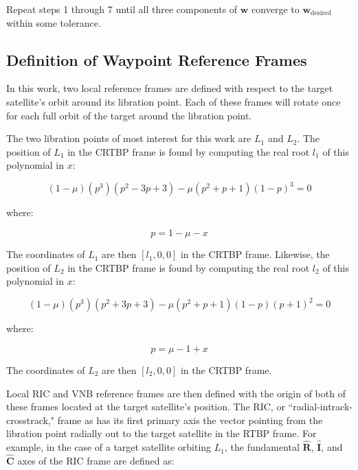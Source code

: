\documentclass[a4paper]{article}
\begin{document}
Repeat steps 1 through 7 until all three components of \(\mathbf{w}\) converge to \(\mathbf{w}_{\mathrm{desired}}\) within some tolerance.


\subsection{Definition of Waypoint Reference Frames}

In this work, two local reference frames are defined with respect to the target satellite's orbit around its libration point.  Each of these frames will rotate once for each full orbit of the target around the libration point.

The two libration points of most interest for this work are \(L_1\) and \(L_2\).  The position of \(L_1\) in the CRTBP frame is found by computing the real root \(l_1\) of this polynomial in \(x\):

\begin{equation} \label{eq:L1}
(1 - \mu)(p^3)(p^2 - 3p + 3) - \mu(p^2 + p + 1)(1 - p)^3 = 0
\end{equation}

where:

\begin{equation*}
p = 1 - \mu - x
\end{equation*}

The coordinates of \(L_1\) are then \([l_1, 0, 0]\) in the CRTBP frame.  Likewise, the position of \(L_2\) in the CRTBP frame is found by computing the real root \(l_2\) of this polynomial in \(x\):

\begin{equation} \label{eq:L2}
(1 - \mu)(p^3)(p^2 + 3p + 3) - \mu(p^2 + p + 1)(1 - p)(p + 1)^2 = 0
\end{equation}

where:

\begin{equation*}
p = \mu - 1 + x
\end{equation*}

The coordinates of \(L_2\) are then \([l_2, 0, 0]\) in the CRTBP frame.

Local RIC and VNB reference frames are then defined with the origin of both of these frames located at the target satellite's position.  The RIC, or ``radial-intrack-crosstrack," frame as has its first primary axis the vector pointing from the libration point radially out to the target satellite in the RTBP frame.  For example, in the case of a target satellite orbiting \(L_1\), the fundamental \(\mathbf{\hat{R}}\), \(\mathbf{\hat{I}}\), and \(\mathbf{\hat{C}}\) axes of the RIC frame are defined as:
\end{document}
